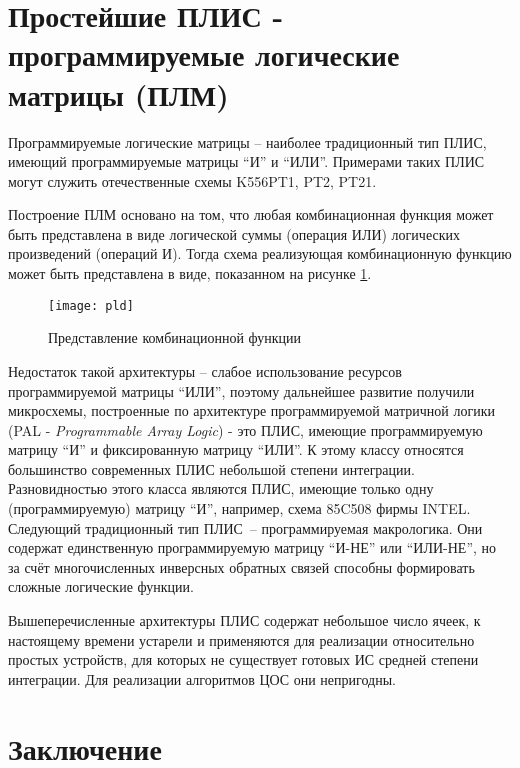 \vspace*{2em} %

\section{Простейшие ПЛИС - программируемые логические матрицы (ПЛМ)}

Программируемые логические матрицы -- наиболее традиционный тип ПЛИС, имеющий
программируемые матрицы ``И'' и ``ИЛИ''. 
Примерами таких ПЛИС могут служить отечественные схемы K556PT1, PT2, PT21.

Построение ПЛМ основано на том, что любая комбинационная функция может быть
представлена в виде логической суммы (операция ИЛИ) логических произведений
(операций И). Тогда схема реализующая комбинационную функцию может быть
представлена в виде, показанном на рисунке \ref{pic_2}.

\begin{figure}[h!]
    \centering
    \texttt{[image: pld]}
    \caption{Представление комбинационной функции}
    \label{pic_2}
\end{figure}

Недостаток такой архитектуры -- слабое использование ресурсов программируемой
матрицы ``ИЛИ'', поэтому дальнейшее развитие получили микросхемы, построенные
по архитектуре программируемой матричной логики (PAL - \emph{Programmable Array
Logic}) - это ПЛИС, имеющие программируемую матрицу ``И'' и фиксированную
матрицу ``ИЛИ''. К этому классу относятся большинство современных ПЛИС
небольшой степени интеграции. Разновидностью этого класса являются ПЛИС,
имеющие только одну (программируемую) матрицу ``И'', например, схема 85C508
фирмы INTEL. Следующий традиционный тип ПЛИС~-- программируемая макрологика.
Они содержат единственную программируемую матрицу ``И-НЕ'' или ``ИЛИ-НЕ'', но
за счёт многочисленных инверсных обратных связей способны формировать сложные
логические функции. 

Вышеперечисленные архитектуры ПЛИС содержат небольшое число ячеек, к настоящему
времени устарели и применяются для реализации относительно простых
устройств, для которых не существует готовых ИС средней степени интеграции.
Для реализации алгоритмов ЦОС они непригодны.

\vspace*{2em}

\section*{Заключение}

